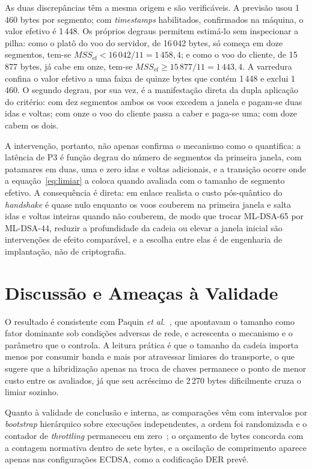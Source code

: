 \documentclass[conference]{IEEEtran}
\begin{document}
As duas discrepâncias têm a mesma origem e são verificáveis. A previsão usou
1\,460 bytes por segmento; com \textit{timestamps} habilitados, confirmados na
máquina, o valor efetivo é 1\,448. Os próprios degraus permitem estimá-lo sem
inspecionar a pilha: como o platô do voo do servidor, de 16\,042 bytes, só começa
em doze segmentos, tem-se $\mathit{MSS}_{\mathrm{ef}} < 16\,042/11 = 1\,458{,}4$;
e como o voo do cliente, de 15\,877 bytes, já cabe em onze, tem-se
$\mathit{MSS}_{\mathrm{ef}} \geq 15\,877/11 = 1\,443{,}4$. A varredura confina o
valor efetivo a uma faixa de quinze bytes que contém 1\,448 e exclui 1\,460. O
segundo degrau, por sua vez, é a manifestação direta da dupla aplicação do
critério: com dez segmentos ambos os voos excedem a janela e pagam-se duas idas e
voltas; com onze o voo do cliente passa a caber e paga-se uma; com doze cabem os
dois.

A intervenção, portanto, não apenas confirma o mecanismo como o quantifica: a
latência de P3 é função degrau do número de segmentos da primeira janela, com
patamares em duas, uma e zero idas e voltas adicionais, e a transição ocorre onde
a equação~\eqref{eq:limiar} a coloca quando avaliada com o tamanho de segmento
efetivo. A consequência é direta: em enlace realista o custo pós-quântico do
\textit{handshake} é quase nulo enquanto os voos couberem na primeira janela e
salta idas e voltas inteiras quando não couberem, de modo que trocar ML-DSA-65
por ML-DSA-44, reduzir a profundidade da cadeia ou elevar a janela inicial são
intervenções de efeito comparável, e a escolha entre elas é de engenharia de
implantação, não de criptografia.

\section{Discussão e Ameaças à Validade}
\label{sec:discussao}

O resultado é consistente com Paquin \textit{et
al.}~\cite{paquin2020benchmarking}, que apontavam o tamanho como fator dominante
sob condições adversas de rede, e acrescenta o mecanismo e o parâmetro que o
controla. A leitura prática é que o tamanho da cadeia importa menos por consumir
banda e mais por atravessar limiares do transporte, o que sugere que a
hibridização apenas na troca de chaves permanece o ponto de menor custo entre os
avaliados, já que seu acréscimo de 2\,270 bytes dificilmente cruza o limiar
sozinho.

Quanto à validade de conclusão e interna, as comparações vêm com intervalos por
\textit{bootstrap} hierárquico sobre execuções independentes, a ordem foi
randomizada e o contador de \textit{throttling} permaneceu em
zero~\cite{mytkowicz2009wrong}; o orçamento de bytes concorda com a contagem
normativa dentro de sete bytes, e a oscilação de comprimento aparece apenas nas
configurações ECDSA, como a codificação DER prevê.
\end{document}
